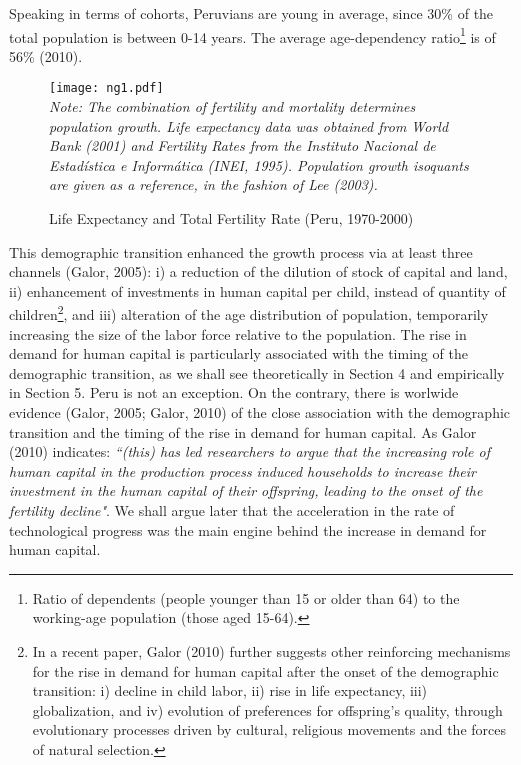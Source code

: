 \documentclass[12pt]{article}%
\begin{document}
Speaking in terms of cohorts, Peruvians are young in average, since 30\% of the total population is between 0-14 years. The average age-dependency ratio\footnote{Ratio of dependents (people younger than 15 or older than 64) to the working-age population (those aged 15-64).} is of 56\% (2010).
\begin{figure}[h]
\caption{Life Expectancy and Total Fertility Rate (Peru, 1970-2000)}
\centering
\texttt{[image: ng1.pdf]} \\
\footnotesize
\textit{Note: The combination of fertility and mortality determines population growth. Life expectancy data was obtained from World Bank (2001) and Fertility Rates from the Instituto Nacional de Estad\'istica e Inform\'atica (INEI, 1995). Population growth isoquants are given as a reference, in the fashion of Lee (2003).}
\label{le}
\end{figure}
This demographic transition enhanced the growth process via at least three channels (Galor, 2005): i) a reduction of the dilution of stock of capital and land, ii) enhancement of investments in human capital per child, instead of quantity of children\footnote{In a recent paper, Galor (2010) further suggests other reinforcing mechanisms for the rise in demand for human capital after the onset of the demographic transition: i) decline in child labor, ii) rise in life expectancy, iii) globalization, and iv) evolution of preferences for offspring's quality, through evolutionary processes driven by cultural, religious movements and the forces of natural selection.}, and iii) alteration of the age distribution of population, temporarily increasing the size of the labor force relative to the population. The rise in demand for human capital is particularly associated with the timing of the demographic transition, as we shall see theoretically in Section 4 and empirically in Section 5. Peru is not an exception. On the contrary, there is worlwide evidence (Galor, 2005; Galor, 2010) of the close association with the demographic transition and the timing of the rise in demand for human capital. As Galor (2010) indicates: \emph{``(this) has led researchers to argue that the increasing role of human capital in the production process induced households to increase their investment in the human capital of their offspring, leading to the onset of the fertility decline"}. We shall argue later that the acceleration in the rate of technological progress was the main engine behind the increase in demand for human capital.
\end{document}
